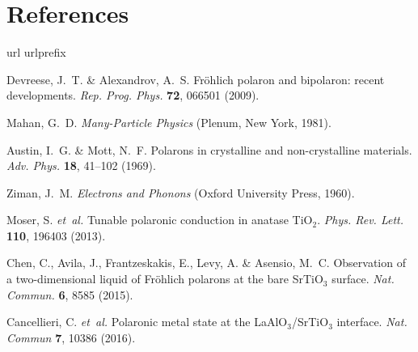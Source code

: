 \documentclass[12pt]{nature}
\begin{document}
\section*{\textsf{References}}
%
%
\begin{thebibliography}{10}
\expandafter\ifx\csname url\endcsname\relax
  \def\url#1{\texttt{#1}}\fi
\expandafter\ifx\csname urlprefix\endcsname\relax\def\urlprefix{URL }\fi
\providecommand{\bibinfo}[2]{#2}
\providecommand{\eprint}[2][]{\url{#2}}

\bibinfo{author}{Devreese, J.~T.} \& \bibinfo{author}{Alexandrov, A.~S.}
\newblock \bibinfo{title}{Fr\"{o}hlich polaron and bipolaron: recent
  developments}.
\newblock \emph{\bibinfo{journal}{Rep. Prog. Phys.}}
  \textbf{\bibinfo{volume}{72}}, \bibinfo{pages}{066501}
  (\bibinfo{year}{2009}).

\bibinfo{author}{Mahan, G.~D.}
\newblock \emph{\bibinfo{title}{Many-Particle Physics}}
  (\bibinfo{publisher}{Plenum}, \bibinfo{address}{New York},
  \bibinfo{year}{1981}).

\bibinfo{author}{Austin, I.~G.} \& \bibinfo{author}{Mott, N.~F.}
\newblock \bibinfo{title}{Polarons in crystalline and non-crystalline
  materials}.
\newblock \emph{\bibinfo{journal}{Adv. Phys.}} \textbf{\bibinfo{volume}{18}},
  \bibinfo{pages}{41--102} (\bibinfo{year}{1969}).

\bibinfo{author}{Ziman, J.~M.}
\newblock \emph{\bibinfo{title}{Electrons and Phonons}}
  (\bibinfo{publisher}{Oxford University Press}, \bibinfo{year}{1960}).

\bibinfo{author}{Moser, S.} \emph{et~al.}
\newblock \bibinfo{title}{Tunable polaronic conduction in anatase {TiO$_2$}}.
\newblock \emph{\bibinfo{journal}{Phys. Rev. Lett.}}
  \textbf{\bibinfo{volume}{110}}, \bibinfo{pages}{196403}
  (\bibinfo{year}{2013}).

\bibinfo{author}{Chen, C.}, \bibinfo{author}{Avila, J.},
  \bibinfo{author}{Frantzeskakis, E.}, \bibinfo{author}{Levy, A.} \&
  \bibinfo{author}{Asensio, M.~C.}
\newblock \bibinfo{title}{Observation of a two-dimensional liquid of
  {Fr\"ohlich} polarons at the bare {SrTiO$_3$} surface}.
\newblock \emph{\bibinfo{journal}{Nat. Commun.}} \textbf{\bibinfo{volume}{6}},
  \bibinfo{pages}{8585} (\bibinfo{year}{2015}).

\bibinfo{author}{Cancellieri, C.} \emph{et~al.}
\newblock \bibinfo{title}{Polaronic metal state at the {LaAlO$_3$/SrTiO$_3$}
  interface}.
\newblock \emph{\bibinfo{journal}{Nat. Commun}} \textbf{\bibinfo{volume}{7}},
  \bibinfo{pages}{10386} (\bibinfo{year}{2016}).


\end{thebibliography}
\end{document}

